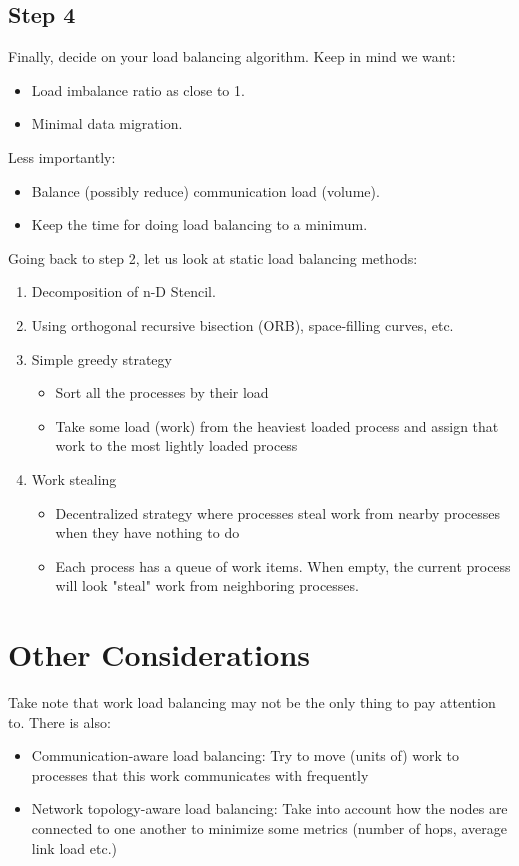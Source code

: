 \documentclass{article}
\begin{document}
\subsection{Step 4}
Finally, decide on your load balancing algorithm. Keep in mind we want:
\begin{itemize}
    \item Load imbalance ratio as close to 1.
    \item Minimal data migration.
\end{itemize}
Less importantly: 
\begin{itemize}
    \item Balance (possibly reduce) communication load (volume).
    \item Keep the time for doing load balancing to a minimum.
\end{itemize}
Going back to step 2, let us look at static load balancing methods:
\begin{enumerate}
    \item Decomposition of n-D Stencil.
    \item Using orthogonal recursive bisection (ORB), space-filling curves, etc.
    \item Simple greedy strategy
        \begin{itemize}
            \item Sort all the processes by their load
            \item Take some load (work) from the heaviest loaded process and assign that work to the
                  most lightly loaded process
        \end{itemize}
    \item Work stealing
        \begin{itemize}
            \item Decentralized strategy where processes steal work from nearby processes when
                  they have nothing to do
            \item Each process has a queue of work items. When empty, the current process will look              "steal" work from neighboring processes.
        \end{itemize}
\end{enumerate}

\section{Other Considerations}
Take note that work load balancing may not be the only thing to pay attention to. There is also:
\begin{itemize}
    \item Communication-aware load balancing: Try to move (units of) work to processes that this work communicates with frequently
    \item Network topology-aware load balancing: Take into account how the nodes are connected to one another to minimize some metrics (number of hops,
    average link load etc.)
\end{itemize}
\end{document}
